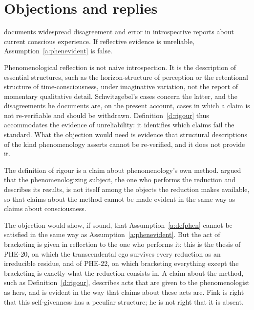 \documentclass{situationist-preprint}
\begin{document}
\section{Objections and replies}

\begin{objection}
\citet{Schwitzgebel2008} documents widespread disagreement and error in introspective reports about current conscious experience. If reflective evidence is unreliable, Assumption~\ref{a:phenevident} is false.
\end{objection}

\begin{reply}
Phenomenological reflection is not naive introspection. It is the description of essential structures, such as the horizon-structure of perception or the retentional structure of time-consciousness, under imaginative variation, not the report of momentary qualitative detail. Schwitzgebel's cases concern the latter, and the disagreements he documents are, on the present account, cases in which a claim is not re-verifiable and should be withdrawn. Definition~\ref{d:rigour} thus accommodates the evidence of unreliability: it identifies which claims fail the standard. What the objection would need is evidence that structural descriptions of the kind phenomenology asserts cannot be re-verified, and it does not provide it.
\end{reply}

\begin{objection}
The definition of rigour is a claim about phenomenology's own method. \citet{Fink1995} argued that the phenomenologizing subject, the one who performs the reduction and describes its results, is not itself among the objects the reduction makes available, so that claims about the method cannot be made evident in the same way as claims about consciousness.
\end{objection}

\begin{reply}
The objection would show, if sound, that Assumption~\ref{a:defphen} cannot be satisfied in the same way as Assumption~\ref{a:phenevident}. But the act of bracketing is given in reflection to the one who performs it; this is the thesis of PHE-20, on which the transcendental ego survives every reduction as an irreducible residue, and of PHE-22, on which bracketing everything except the bracketing is exactly what the reduction consists in. A claim about the method, such as Definition~\ref{d:rigour}, describes acts that are given to the phenomenologist as hers, and is evident in the way that claims about these acts are. Fink is right that this self-givenness has a peculiar structure; he is not right that it is absent.
\end{reply}
\end{document}
